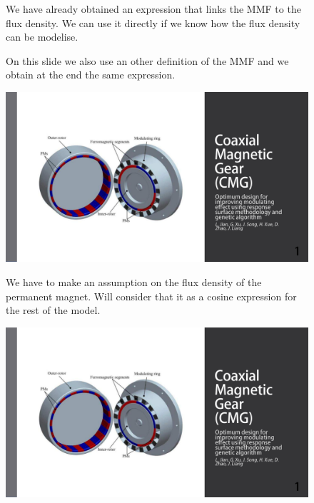 \begin{figure}[H]
    \begin{minipage}{.45\linewidth}
        We have already obtained an expression that links the MMF to the flux density. We can use it directly if we know how the flux density can be modelise.
        
        On this slide we also use an other definition of the MMF and we obtain at the end the same expression.
    \end{minipage}
    \hfill%
    \begin{minipage}[c]{.45\linewidth}
        \centering
        \includegraphics[page={17},width=\textwidth]{LELEC2311.allow.pdf}
    \end{minipage}
\end{figure}

\begin{figure}[H]
    \begin{minipage}{.45\linewidth}
      We have to make an assumption on the flux density of the permanent magnet. Will consider that it as a cosine expression for the rest of the model.
    \end{minipage}
    \hfill%
    \begin{minipage}[c]{.45\linewidth}
        \centering
        \includegraphics[page={18},width=\textwidth]{LELEC2311.allow.pdf}
    \end{minipage}
\end{figure}

